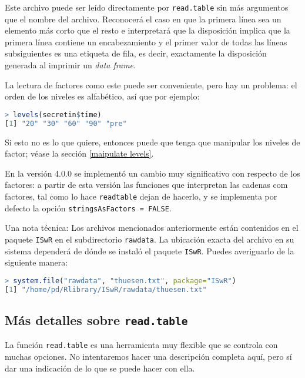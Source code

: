 Este archivo puede ser leído directamente por \texttt{read.table} sin más argumentos que
el nombre del archivo. Reconocerá el caso en que la primera línea sea un
elemento más corto que el resto e interpretará que la disposición implica que la
primera línea contiene un encabezamiento y el primer valor de todas las líneas
subsiguientes es una etiqueta de fila, es decir, exactamente la disposición
generada al imprimir un \textit{data frame}.

La lectura de factores como este puede ser conveniente, pero hay un
problema: el orden de los niveles es alfabético, así que por ejemplo:

\begin{lstlisting}[language=R]
> levels(secretin$time)
[1] "20" "30" "60" "90" "pre"
\end{lstlisting}

Si esto no es lo que quiere, entonces puede que tenga que manipular los niveles
de factor; véase la sección \ref{maipulate levels}.

\begin{tradnote}En la versión 4.0.0 se implementó un cambio muy significativo
con respecto de los factores: a partir de esta versión las funciones que
interpretan las cadenas com factores, tal como lo hace \texttt{readtable} dejan
de hacerlo, y se implementa por defecto la opción \texttt{stringsAsFactors =
FALSE}.
\end{tradnote}

Una nota técnica: Los archivos mencionados anteriormente están contenidos en el
paquete \texttt{ISwR} en el subdirectorio \texttt{rawdata}. La ubicación exacta
del archivo en su sistema dependerá de dónde se instaló el paquete
\texttt{ISwR}. Puedes averiguarlo de la siguiente manera:

\begin{lstlisting}[language=R]
> system.file("rawdata", "thuesen.txt", package="ISwR")
[1] "/home/pd/Rlibrary/ISwR/rawdata/thuesen.txt"
\end{lstlisting}

\subsection{Más detalles sobre \texttt{read.table}}

La función \texttt{read.table} es una herramienta muy flexible que se controla
con muchas opciones. No intentaremos hacer una descripción completa aquí, pero
sí dar una indicación de lo que se puede hacer con ella.

